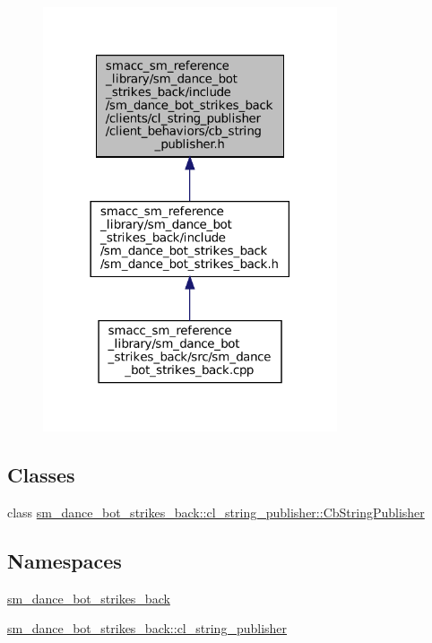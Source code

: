 \begin{figure}[H]
\begin{center}
\leavevmode
\includegraphics[width=246pt]{strikes__back_2include_2sm__dance__bot__strikes__back_2clients_2cl__string__publisher_2client__b8a29aacdbda40677e8b012a23c789575}
\end{center}
\end{figure}
\subsection*{Classes}
\begin{DoxyCompactItemize}
\item 
class \hyperlink{classsm__dance__bot__strikes__back_1_1cl__string__publisher_1_1CbStringPublisher}{sm\+\_\+dance\+\_\+bot\+\_\+strikes\+\_\+back\+::cl\+\_\+string\+\_\+publisher\+::\+Cb\+String\+Publisher}
\end{DoxyCompactItemize}
\subsection*{Namespaces}
\begin{DoxyCompactItemize}
\item 
 \hyperlink{namespacesm__dance__bot__strikes__back}{sm\+\_\+dance\+\_\+bot\+\_\+strikes\+\_\+back}
\item 
 \hyperlink{namespacesm__dance__bot__strikes__back_1_1cl__string__publisher}{sm\+\_\+dance\+\_\+bot\+\_\+strikes\+\_\+back\+::cl\+\_\+string\+\_\+publisher}
\end{DoxyCompactItemize}
